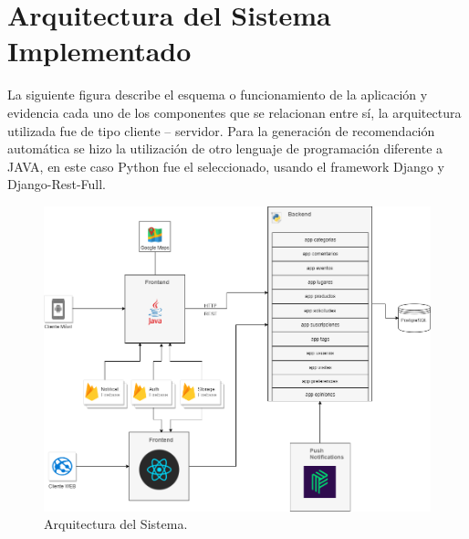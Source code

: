 \documentclass[12pt,letterpaper,openany]{book}
\begin{document}
\section{Arquitectura del Sistema Implementado}
La siguiente figura describe el esquema o funcionamiento de la aplicación y evidencia cada uno de los componentes que se relacionan entre sí, la arquitectura utilizada fue de tipo cliente – servidor. Para la generación de recomendación automática se hizo la utilización de otro lenguaje de programación diferente a JAVA, en este caso Python fue el seleccionado, usando el framework Django y Django-Rest-Full.
\begin{figure}[H]
\begin{center}
\includegraphics[width=13cm]{./imagenes/arquitectura}
\caption{Arquitectura del Sistema.}
\end{center}
\end{figure}
\end{document}
